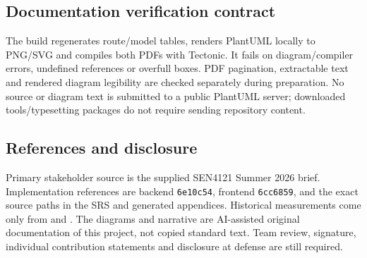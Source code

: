 \documentclass[10pt,a4paper]{article}
\begin{document}
\subsection{Documentation verification contract}
The build regenerates route/model tables, renders PlantUML locally to PNG/SVG and
compiles both PDFs with Tectonic. It fails on diagram/compiler errors, undefined
references or overfull boxes. PDF pagination, extractable text and rendered diagram
legibility are checked separately during preparation. No source or diagram text
is submitted to a public PlantUML server; downloaded tools/typesetting packages
do not require sending repository content.

\subsection{References and disclosure}
Primary stakeholder source is the supplied SEN4121 Summer 2026 brief.
Implementation references are backend \texttt{6e10c54}, frontend \texttt{6cc6859},
and the exact source paths in the SRS and generated appendices.
Historical measurements come only from  and
. The diagrams and narrative are AI-assisted original
documentation of this project, not copied standard text. Team review, signature,
individual contribution statements and disclosure at defense are still required.
\end{document}
